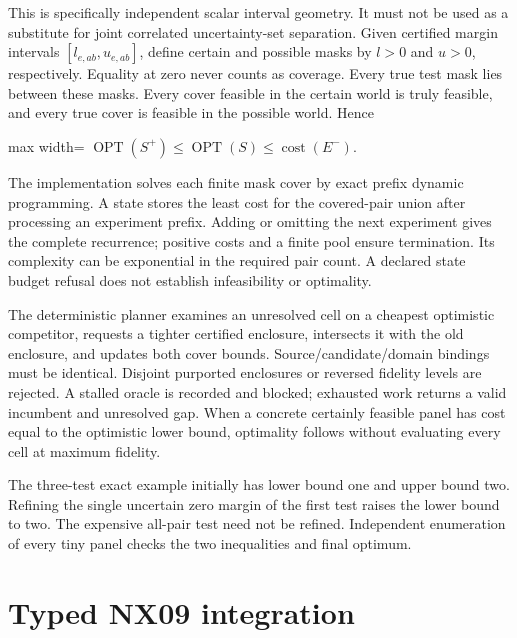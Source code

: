\documentclass[
  11pt,
  a4paper,
]{report}
\begin{document}
This is specifically independent scalar interval geometry. It must not
be used as a substitute for joint correlated uncertainty-set separation.
Given certified margin intervals \([l_{e,ab},u_{e,ab}]\), define certain
and possible masks by \(l>0\) and \(u>0\), respectively. Equality at
zero never counts as coverage. Every true test mask lies between these
masks. Every cover feasible in the certain world is truly feasible, and
every true cover is feasible in the possible world. Hence

\begin{center}
\begin{adjustbox}{max width=\linewidth}
$\displaystyle
\operatorname{OPT}(S^+)\le\operatorname{OPT}(S)
\le\operatorname{cost}(E^-).
$
\end{adjustbox}
\end{center}

The implementation solves each finite mask cover by exact prefix dynamic
programming. A state stores the least cost for the covered-pair union
after processing an experiment prefix. Adding or omitting the next
experiment gives the complete recurrence; positive costs and a finite
pool ensure termination. Its complexity can be exponential in the
required pair count. A declared state budget refusal does not establish
infeasibility or optimality.

The deterministic planner examines an unresolved cell on a cheapest
optimistic competitor, requests a tighter certified enclosure,
intersects it with the old enclosure, and updates both cover bounds.
Source/candidate/domain bindings must be identical. Disjoint purported
enclosures or reversed fidelity levels are rejected. A stalled oracle is
recorded and blocked; exhausted work returns a valid incumbent and
unresolved gap. When a concrete certainly feasible panel has cost equal
to the optimistic lower bound, optimality follows without evaluating
every cell at maximum fidelity.

The three-test exact example initially has lower bound one and upper
bound two. Refining the single uncertain zero margin of the first test
raises the lower bound to two. The expensive all-pair test need not be
refined. Independent enumeration of every tiny panel checks the two
inequalities and final optimum.

\hypertarget{typed-nx09-integration}{%
\section{Typed NX09 integration}\label{typed-nx09-integration}}
\end{document}
